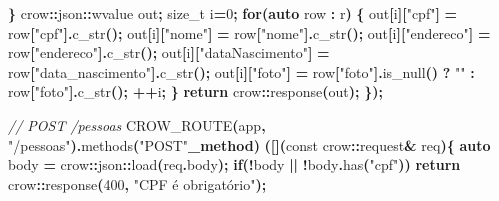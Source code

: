 \documentclass[
]{book}
\newenvironment{Shaded}{\begin{snugshade}}{\end{snugshade}}
\newcommand{\AttributeTok}[1]{\textcolor[rgb]{0.13,0.29,0.53}{#1}}
\newcommand{\CommentTok}[1]{\textcolor[rgb]{0.56,0.35,0.01}{\textit{#1}}}
\newcommand{\ControlFlowTok}[1]{\textcolor[rgb]{0.13,0.29,0.53}{\textbf{#1}}}
\newcommand{\DataTypeTok}[1]{\textcolor[rgb]{0.13,0.29,0.53}{#1}}
\newcommand{\DecValTok}[1]{\textcolor[rgb]{0.00,0.00,0.81}{#1}}
\newcommand{\KeywordTok}[1]{\textcolor[rgb]{0.13,0.29,0.53}{\textbf{#1}}}
\newcommand{\NormalTok}[1]{#1}
\newcommand{\OperatorTok}[1]{\textcolor[rgb]{0.81,0.36,0.00}{\textbf{#1}}}
\newcommand{\StringTok}[1]{\textcolor[rgb]{0.31,0.60,0.02}{#1}}
\begin{document}
\begin{Shaded}
\begin{Highlighting}[]
        \OperatorTok{\}}
\NormalTok{        crow}\OperatorTok{::}\NormalTok{json}\OperatorTok{::}\NormalTok{wvalue out}\OperatorTok{;}
        \DataTypeTok{size\_t}\NormalTok{ i}\OperatorTok{=}\DecValTok{0}\OperatorTok{;}
        \ControlFlowTok{for}\OperatorTok{(}\KeywordTok{auto}\NormalTok{ row }\OperatorTok{:}\NormalTok{ r}\OperatorTok{)} \OperatorTok{\{}
\NormalTok{            out}\OperatorTok{[}\NormalTok{i}\OperatorTok{][}\StringTok{"cpf"}\OperatorTok{]} \OperatorTok{=}\NormalTok{ row}\OperatorTok{[}\StringTok{"cpf"}\OperatorTok{].}\NormalTok{c\_str}\OperatorTok{();}
\NormalTok{            out}\OperatorTok{[}\NormalTok{i}\OperatorTok{][}\StringTok{"nome"}\OperatorTok{]} \OperatorTok{=}\NormalTok{ row}\OperatorTok{[}\StringTok{"nome"}\OperatorTok{].}\NormalTok{c\_str}\OperatorTok{();}
\NormalTok{            out}\OperatorTok{[}\NormalTok{i}\OperatorTok{][}\StringTok{"endereco"}\OperatorTok{]} \OperatorTok{=}\NormalTok{ row}\OperatorTok{[}\StringTok{"endereco"}\OperatorTok{].}\NormalTok{c\_str}\OperatorTok{();}
\NormalTok{            out}\OperatorTok{[}\NormalTok{i}\OperatorTok{][}\StringTok{"dataNascimento"}\OperatorTok{]} \OperatorTok{=}\NormalTok{ row}\OperatorTok{[}\StringTok{"data\_nascimento"}\OperatorTok{].}\NormalTok{c\_str}\OperatorTok{();}
\NormalTok{            out}\OperatorTok{[}\NormalTok{i}\OperatorTok{][}\StringTok{"foto"}\OperatorTok{]} \OperatorTok{=}\NormalTok{ row}\OperatorTok{[}\StringTok{"foto"}\OperatorTok{].}\NormalTok{is\_null}\OperatorTok{()} \OperatorTok{?} \StringTok{""} \OperatorTok{:}\NormalTok{ row}\OperatorTok{[}\StringTok{"foto"}\OperatorTok{].}\NormalTok{c\_str}\OperatorTok{();}
            \OperatorTok{++}\NormalTok{i}\OperatorTok{;}
        \OperatorTok{\}}
        \ControlFlowTok{return}\NormalTok{ crow}\OperatorTok{::}\NormalTok{response}\OperatorTok{(}\NormalTok{out}\OperatorTok{);}
    \OperatorTok{\});}

    \CommentTok{// POST /pessoas}
\NormalTok{    CROW\_ROUTE}\OperatorTok{(}\NormalTok{app}\OperatorTok{,} \StringTok{"/pessoas"}\OperatorTok{).}\NormalTok{methods}\OperatorTok{(}\StringTok{"POST"}\OperatorTok{\_method)}
    \OperatorTok{([](}\AttributeTok{const}\NormalTok{ crow}\OperatorTok{::}\NormalTok{request}\OperatorTok{\&}\NormalTok{ req}\OperatorTok{)\{}
        \KeywordTok{auto}\NormalTok{ body }\OperatorTok{=}\NormalTok{ crow}\OperatorTok{::}\NormalTok{json}\OperatorTok{::}\NormalTok{load}\OperatorTok{(}\NormalTok{req}\OperatorTok{.}\NormalTok{body}\OperatorTok{);}
        \ControlFlowTok{if}\OperatorTok{(!}\NormalTok{body }\OperatorTok{||} \OperatorTok{!}\NormalTok{body}\OperatorTok{.}\NormalTok{has}\OperatorTok{(}\StringTok{"cpf"}\OperatorTok{))}
            \ControlFlowTok{return}\NormalTok{ crow}\OperatorTok{::}\NormalTok{response}\OperatorTok{(}\DecValTok{400}\OperatorTok{,} \StringTok{"CPF é obrigatório"}\OperatorTok{);}


\end{Highlighting}
\end{Shaded}
\end{document}
